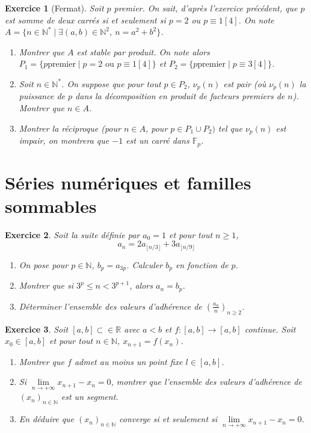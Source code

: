 \documentclass[12pt]{article}
\newtheorem{exercise}{Exercice}[section]
\theoremstyle{remark}
\theoremstyle{remark}
\newcommand{\R}{\mathbb{R}}
\newcommand{\N}{\mathbb{N}}
\begin{document}
\begin{exercise}[Fermat]
	Soit $p$ premier. On sait, d'après l'exercice précédent, que $p$ est somme
	de deux carrés si et seulement si $p=2$ ou $p\equiv 1[4]$. On note
	$A=\{n\in\N^{*}\mid\exists(a,b)\in\N^{2},~n=a^{2}+b^{2}\}$.
	\begin{enumerate}
		\item Montrer que $A$ est stable par produit. On note alors $P_{1}=\{p
		\text{premier}\mid p=2\text{ ou }p\equiv 1[4]\}$ et $P_{2}=\{p\text{
		premier}\mid p\equiv3[4]\}$.
		\item Soit $n\in\N^{*}$. On suppose que pour tout $p\in P_{2}$,
		$\nu_{p}(n)$ est pair (où $\nu_{p}(n)$ la puissance de $p$ dans la décomposition en produit de
		facteurs premiers de $n$). Montrer que $n\in A$.
		\item Montrer la réciproque (pour $n\in A$, pour $p\in P_{1}\cup
		P_{2})$ tel que $\nu_{p}(n)$ est impair, on montrera que $-1$ est un
		carré dans $\mathbb{F}_{p}$.
	\end{enumerate}
\end{exercise}

\cleardoublepage
\section{Séries numériques et familles sommables}

\begin{exercise}
	Soit la suite définie par $a_{0}=1$ et pour tout $n\geqslant1$,
	$$a_{n}=2a_{\lfloor n/3\rfloor}+3a_{\lfloor n/9\rfloor}$$
	\begin{enumerate}
		\item On pose pour $p\in\N$, $b_{p}=a_{3p}$. Calculer $b_{p}$ en
		fonction de $p$.
		\item Montrer que si $3^{p}\leqslant n<3^{p+1}$, alors $a_{n}=b_{p}$.
		\item Déterminer l'ensemble des valeurs d'adhérence de
		$(\frac{a_{n}}{n})_{n\geqslant 2}$.
	\end{enumerate}
\end{exercise}

\begin{exercise}
	Soit $[a,b]\subset\in\R$ avec $a<b$ et $f:[a,b]\to[a,b]$ continue. Soit
	$x_{0}\in[a,b]$ et pour tout $n\in\N$, $x_{n+1}=f(x_{n})$.
	\begin{enumerate}
		\item Montrer que $f$ admet au moins un point fixe $l\in[a,b]$.
		\item Si $\lim\limits_{n\to+\infty}x_{n+1}-x_{n}=0$, montrer que
		l'ensemble des valeurs d'adhérence de $(x_{n})_{n\in\N}$ est un segment.
		\item En déduire que $(x_{n})_{n\in\N}$ converge si et seulement si
		$\lim\limits_{n\to+\infty}x_{n+1}-x_{n}=0$.
	\end{enumerate}
\end{exercise}
\end{document}
